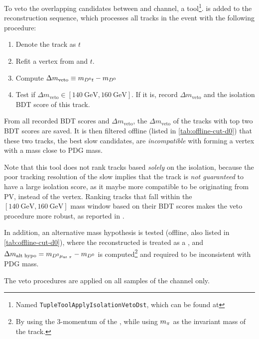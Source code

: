 To veto the overlapping candidates between \Dz and \Dstar channel,
a tool\footnote{
    Named \texttt{TupleToolApplyIsolationVetoDst}, which can be found at
}.
is added to the \davinci reconstruction sequence, which processes all tracks
in the event with the following procedure:

\begin{enumerate}
    \item Denote the track as $t$
    \item Refit a vertex from \Dz and $t$.
    \item Compute $\Delta m_\text{veto} \equiv m_{{{D}^0} t} - m_{{D}^0}$
    \item Test if $\Delta m_\text{veto} \in [140~\text{GeV}, 160~\text{GeV}]$.
        If it is, record $\Delta m_\text{veto}$ and the isolation BDT
        score of this track.
\end{enumerate}

From all recorded BDT scores and $\Delta m_\text{veto}$, the
$\Delta m_\text{veto}$ of the tracks with top two BDT scores are saved.
It is then filtered offline (listed in \cref{tab:offline-cut-d0})
that these two tracks,
the best slow \pion candidates,
are \emph{incompatible} with
forming a \Dz\pion vertex with a mass close to \Dstar PDG mass.

Note that this tool does not rank tracks based \emph{solely} on the isolation,
because the poor tracking resolution of the slow \pion implies that the track is
\emph{not guaranteed} to have a large isolation score, as it maybe more
compatible to be originating from PV, instead of the \B vertex.
Ranking tracks that fall within the $[140~\text{GeV}, 160~\text{GeV}]$
mass window based on their BDT scores
makes the veto procedure more robust, as reported in \cite{LHCb-ANA-2020-056}.

In addition, an alternative mass hypothesis is tested
(offline, also listed in \cref{tab:offline-cut-d0}), where the reconstructed
\muon is treated as a \pion,
and $\Delta m_\text{alt hypo} = m_{{{D}^0}{\mu}_\text{as {\ensuremath{\pi}}}} - m_{{D}^0}$
is computed\footnote{
    By using the 3-momentum of the \muon, while using $m_{\pi}$ as the invariant
    mass of the track.
} and required to be inconsistent with \Dstar PDG mass.

The veto procedures are applied on all samples of the \Dz channel only.
